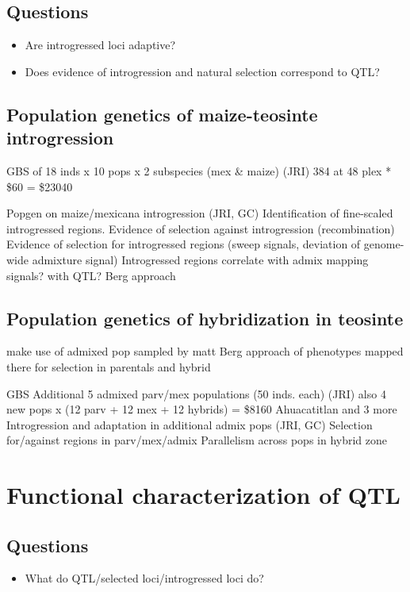 \subsection*{Questions}
\begin{itemize}
\item Are introgressed loci adaptive?
\item Does evidence of introgression and natural selection correspond to QTL?
\end{itemize}

\subsection{Population genetics of maize-teosinte introgression} \label{subsec: intropopgen}

GBS of 18 inds x 10 pops x 2 subspecies (mex \& maize) (JRI)
384 at 48 plex * \$60 = \$23040

Popgen on maize/mexicana introgression (JRI, GC)
Identification of fine-scaled introgressed regions.
Evidence of selection against introgression (recombination)
Evidence of selection for introgressed regions (sweep signals, deviation of genome-wide admixture signal)
Introgressed regions correlate with admix mapping signals? with QTL? Berg approach

\subsection{Population genetics of hybridization in teosinte} \label{subsec: admixpopgen}

make use of admixed pop sampled by matt
Berg approach of phenotypes mapped there for selection in parentals and hybrid

GBS Additional 5 admixed parv/mex populations (50 inds. each) (JRI)
also 4 new pops x (12 parv + 12 mex + 12 hybrids) = \$8160
Ahuacatitlan and 3 more
Introgression and adaptation in additional admix pops (JRI, GC)
Selection for/against regions in parv/mex/admix
Parallelism across pops in hybrid zone

\section{Functional characterization of QTL} \label{sec:funchar}

\subsection{Questions}
\begin{itemize}
\item What do QTL/selected loci/introgressed loci do?
\end{itemize}

